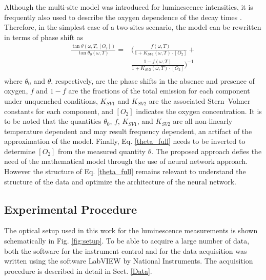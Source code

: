 \documentclass[9pt,twocolumn,twoside,pdftex]{optica}
\begin{document}
Although the multi-site model was introduced for luminescence intensities, it is frequently also used to describe the oxygen dependence of the decay times \cite{Demas1995,Quaranta2012}. Therefore, in the simplest case of a two-sites scenario, the model can be rewritten in terms of phase shift as \cite{Michelucci2019}
\begin{equation}
\begin{aligned}
\frac{\tan \theta (\omega, T, [O_2])}{\tan \theta_0 (\omega, T)} =& \bigg( \frac{f (\omega , T) }{1+K_{SV1} (\omega , T) \cdot \left[O_2\right]}+ \\
&\frac{1-f (\omega , T) }{1+K_{SV2} (\omega , T) \cdot \left[O_2\right]} \bigg)^{-1} \\
\label{theta_full}
\end{aligned}
\end{equation}
where $\theta_0$ and $\theta$, respectively, are the phase shifts in the absence and presence of oxygen, $f$ and $1-f$ are the fractions of the total emission for each component under unquenched conditions, $K_{SV1}$ and $K_{SV2}$ are the associated Stern–Volmer constants for each component, and $\left[O_2\right]$ indicates the oxygen concentration. It is to be noted that the quantities $\theta_0$, $f$, $K_{SV1}$, and $K_{SV2}$ are all non-linearly temperature dependent \cite{Ogurtsov2006,lo2008,Zaitsev2016} and may result frequency dependent, an artifact of the approximation of the model. Finally, Eq. \ref{theta_full} needs to be inverted to determine $[O_2]$ from the measured quantity $\theta$. The proposed approach defies the need of the mathematical model through the use of neural network approach. However the structure of Eq. \ref{theta_full} remains relevant to understand the structure of the data and optimize the architecture of the neural network.


\subsection{Experimental Procedure}
\label{Experimental}

The optical setup used in this work for the luminescence measurements is shown schematically in Fig. \ref{fig:setup}. To be able to acquire a large number of data, both the software for the instrument control and for the data acquisition was written using the software LabVIEW by National Instruments. The acquisition procedure is described in detail in Sect. \ref{Data}.
\end{document}
